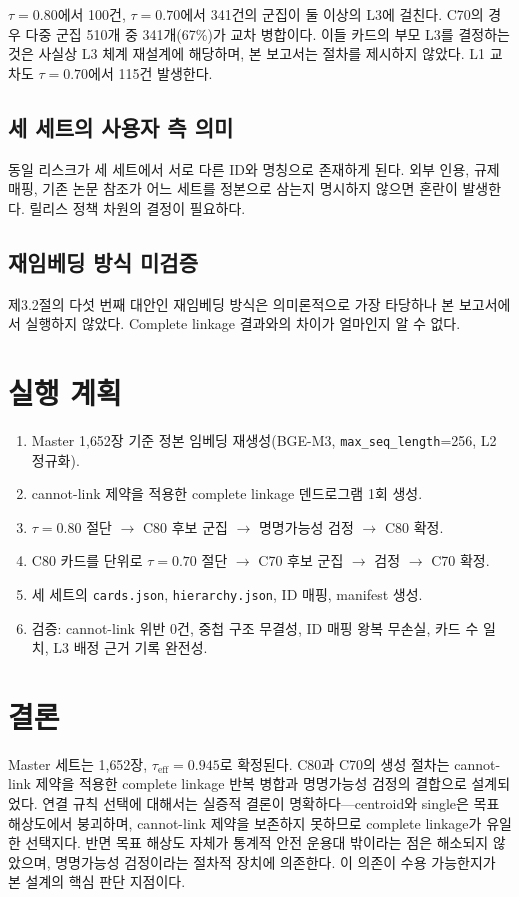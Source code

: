 \documentclass[11pt,a4paper]{article}
\begin{document}
$\tau=0.80$에서 100건, $\tau=0.70$에서 341건의 군집이 둘 이상의 L3에 걸친다. C70의 경우 다중 군집 510개 중 341개(67\%)가 교차 병합이다. 이들 카드의 부모 L3를 결정하는 것은 사실상 L3 체계 재설계에 해당하며, 본 보고서는 절차를 제시하지 않았다. L1 교차도 $\tau=0.70$에서 115건 발생한다.

\subsection{세 세트의 사용자 측 의미}

동일 리스크가 세 세트에서 서로 다른 ID와 명칭으로 존재하게 된다. 외부 인용, 규제 매핑, 기존 논문 참조가 어느 세트를 정본으로 삼는지 명시하지 않으면 혼란이 발생한다. 릴리스 정책 차원의 결정이 필요하다.

\subsection{재임베딩 방식 미검증}

제3.2절의 다섯 번째 대안인 재임베딩 방식은 의미론적으로 가장 타당하나 본 보고서에서 실행하지 않았다. Complete linkage 결과와의 차이가 얼마인지 알 수 없다.

\section{실행 계획}

\begin{enumerate}[leftmargin=1.6em,itemsep=2pt]
  \item Master 1{,}652장 기준 정본 임베딩 재생성(BGE-M3, \texttt{max\_seq\_length}=256, L2 정규화).
  \item cannot-link 제약을 적용한 complete linkage 덴드로그램 1회 생성.
  \item $\tau=0.80$ 절단 $\rightarrow$ C80 후보 군집 $\rightarrow$ 명명가능성 검정 $\rightarrow$ C80 확정.
  \item C80 카드를 단위로 $\tau=0.70$ 절단 $\rightarrow$ C70 후보 군집 $\rightarrow$ 검정 $\rightarrow$ C70 확정.
  \item 세 세트의 \texttt{cards.json}, \texttt{hierarchy.json}, ID 매핑, manifest 생성.
  \item 검증: cannot-link 위반 0건, 중첩 구조 무결성, ID 매핑 왕복 무손실, 카드 수 일치, L3 배정 근거 기록 완전성.
\end{enumerate}

\section{결론}

Master 세트는 1{,}652장, $\tau_{\mathrm{eff}}=0.945$로 확정된다. C80과 C70의 생성 절차는 cannot-link 제약을 적용한 complete linkage 반복 병합과 명명가능성 검정의 결합으로 설계되었다. 연결 규칙 선택에 대해서는 실증적 결론이 명확하다---centroid와 single은 목표 해상도에서 붕괴하며, cannot-link 제약을 보존하지 못하므로 complete linkage가 유일한 선택지다. 반면 목표 해상도 자체가 통계적 안전 운용대 밖이라는 점은 해소되지 않았으며, 명명가능성 검정이라는 절차적 장치에 의존한다. 이 의존이 수용 가능한지가 본 설계의 핵심 판단 지점이다.
\end{document}
